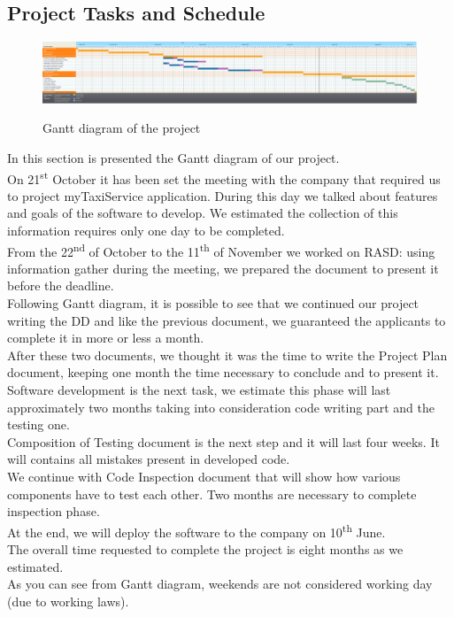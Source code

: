 \newpage
\begin{landscape}
\section{Project Tasks and Schedule}
\begin{figure}[H]
\centering
\includegraphics[scale=0.25]{DiagramSources/Ganttingsoftware2.png}
\label{Figure 1: }\caption{Gantt diagram of the project}
\end{figure}
\end{landscape}
In this section is presented the Gantt diagram of our project.\\
On 21\textsuperscript{st} October it has been set the meeting with the company that required us to project myTaxiService application. During this day we talked about features and goals of the software to develop. We estimated the collection of this information requires only one day to be completed. \\
From the 22\textsuperscript{nd} of October to the 11\textsuperscript{th} of November we worked on RASD: using information gather during the meeting, we prepared the document to present it before the deadline. \\
Following Gantt diagram, it is possible to see that we continued our project writing the DD and like the previous document, we guaranteed the applicants to complete it in more or less a month. \\
After these two documents, we thought it was the time to write the Project Plan document, keeping one month the time necessary to conclude and to present it. \\
Software development is the next task, we estimate this phase will last approximately two months taking into consideration code writing part and the testing one. \\
Composition of Testing document is the next step and it will last four weeks. It will contains all mistakes present in developed code. \\
We continue with Code Inspection document that will show how various components have to test each other. Two months are necessary to complete inspection phase. \\
At the end, we will deploy the software to the company on 10\textsuperscript{th} June. \\
The overall time requested to complete the project is eight months as we estimated. \\
As you can see from Gantt diagram, weekends are not considered working day (due to working laws).\\      